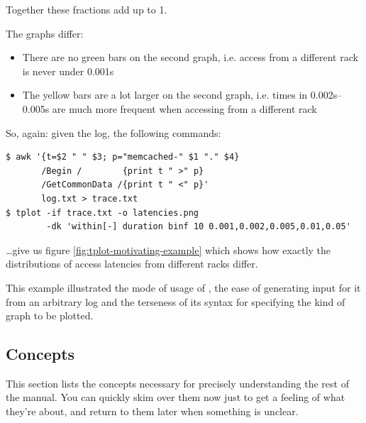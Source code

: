 \documentclass{article}
\begin{document}
Together these fractions add up to 1.

The graphs differ:
\begin{itemize}
\item There are no green bars on the second graph, i.e. access from a different rack is never under 0.001s
\item The yellow bars are a lot larger on the second graph, i.e. times in 0.002s--0.005s are much more frequent when accessing from a different rack
\end{itemize}

So, again: given the log, the following commands:

\begin{verbatim}
$ awk '{t=$2 " " $3; p="memcached-" $1 "." $4}
       /Begin /        {print t " >" p} 
       /GetCommonData /{print t " <" p}'
       log.txt > trace.txt
$ tplot -if trace.txt -o latencies.png
        -dk 'within[-] duration binf 10 0.001,0.002,0.005,0.01,0.05'
\end{verbatim}

\ldots give us figure \ref{fig:tplot-motivating-example} which shows how exactly the distributions of access latencies from different racks differ.

This example illustrated the mode of usage of \timeplot{}, the ease of generating input for it from an arbitrary log and the terseness of its syntax for specifying the kind of graph to be plotted.

\subsection{Concepts}
\label{sec:tplot-concepts}

This section lists the concepts necessary for precisely understanding the rest of the manual. You can quickly skim over them now just to get a feeling of what they're about, and return to them later when something is unclear.
\end{document}
